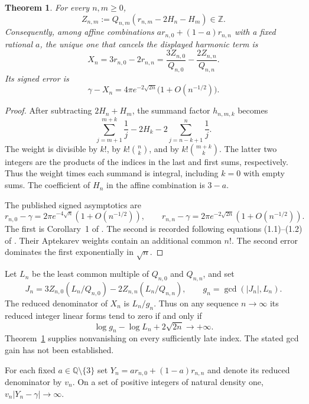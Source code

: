 \documentclass[11pt,a4paper,oneside,openany]{report}
\newtheorem{theorem}{Theorem}[section]
\theoremstyle{remark}\newtheorem{remark}[theorem]{Remark}
\numberwithin{equation}{section}
\begin{document}
\begin{theorem}\label{ch3:sh3:integer}
For every $n,m\ge0$,
\[
 Z_{n,m}:=Q_{n,m}(r_{n,m}-2H_n-H_m)\in\mathbb Z.
\]
Consequently, among affine combinations $a r_{n,0}+(1-a)r_{n,n}$
with a fixed rational $a$, the unique one that cancels the displayed
harmonic term is
\[
 X_n=3r_{n,0}-2r_{n,n}
     =\frac{3Z_{n,0}}{Q_{n,0}}-\frac{2Z_{n,n}}{Q_{n,n}}.
\]
Its signed error is
\[
 \gamma-X_n=4\pi e^{-2\sqrt{2n}}\bigl(1+O(n^{-1/2})\bigr).
\]
\end{theorem}

\begin{proof}
After subtracting $2H_n+H_m$, the summand factor $h_{n,m,k}$ becomes
\[
 \sum_{j=m+1}^{m+k}\frac1j-2H_k
                       -2\sum_{j=n-k+1}^{n}\frac1j .
\]
The weight is divisible by $k!$, by $k!\binom nk$, and by
$k!\binom{m+k}{k}$. The latter two integers are the products of the
indices in the last and first sums, respectively. Thus the weight
times each summand is integral, including $k=0$ with empty sums.
The coefficient of $H_n$ in the affine combination is $3-a$.

The published signed asymptotics are
\[
 r_{n,0}-\gamma=2\pi e^{-4\sqrt n}(1+O(n^{-1/2})),\qquad
 r_{n,n}-\gamma=2\pi e^{-2\sqrt{2n}}(1+O(n^{-1/2})).
\]
The first is Corollary~1 of \cite{hp}. The second is recorded following equations (1.1)--(1.2) of \cite{bell}. Their Aptekarev weights contain an additional common $n!$.
The second error dominates the first exponentially in $\sqrt n$.
\end{proof}

Let $L_n$ be the least common multiple of $Q_{n,0}$ and $Q_{n,n}$, and set
\[
 J_n=3Z_{n,0}(L_n/Q_{n,0})-2Z_{n,n}(L_n/Q_{n,n}),\qquad
 g_n=\gcd(|J_n|,L_n).
\]
The reduced denominator of $X_n$ is $L_n/g_n$. Thus on any sequence
$n\to\infty$ its reduced integer linear forms tend to zero if and
only if
\[
 \log g_n-\log L_n+2\sqrt{2n}\longrightarrow+\infty.
\]
Theorem~\ref{ch3:sh3:integer} supplies nonvanishing on every sufficiently
late index. The stated gcd gain has not been established.

\begin{proposition}\label{ch3:sh3:density}
For each fixed $a\in\mathbb Q\setminus\{3\}$ set
$Y_n=a r_{n,0}+(1-a)r_{n,n}$ and denote its reduced denominator
by $v_n$. On a set of positive integers of natural density one,
$v_n|Y_n-\gamma|\to\infty$.
\end{proposition}
\end{document}
